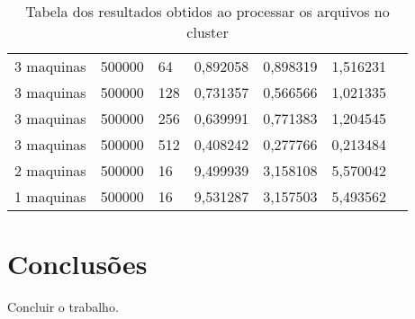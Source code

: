 \documentclass[12pt]{article}
\begin{document}
\begin{table}[]
\begin{tabular}{l|llllll}
3 maquinas & 500000     & 64              & 0,892058            & 0,898319          & 1,516231   &            \\
3 maquinas & 500000     & 128             & 0,731357            & 0,566566          & 1,021335   &            \\
3 maquinas & 500000     & 256             & 0,639991            & 0,771383          & 1,204545   &            \\
3 maquinas & 500000     & 512             & 0,408242            & 0,277766          & 0,213484   &            \\
2 maquinas & 500000          & 16                  & 9,499939          & 3,158108   & 5,570042   \\
1 maquinas & 500000          & 16                  & 9,531287          & 3,157503   & 5,493562  
\end{tabular}
\caption{Tabela dos resultados obtidos ao processar os arquivos no cluster}
\label{tab:table-result-cluster}
\end{table}
\section{Conclusões}
Concluir o trabalho.



\end{document}
